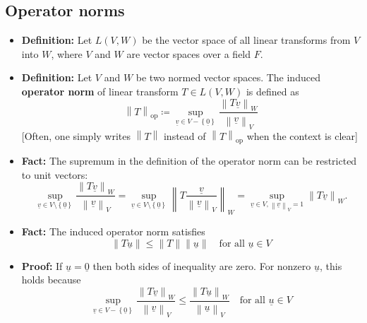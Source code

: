 \documentclass[11pt,twoside]{report}
\newcommand{\vecnot}{\underline}
\begin{document}
\subsection{Operator norms} 

\begin{itemize}

\item \textbf{Definition:} Let $L(V,W)$ be the vector space of all linear transforms from $V$ into $W$, where $V$ and $W$ are vector spaces over a field $F$.

\item \textbf{Definition:} Let $V$ and $W$ be two normed vector spaces. The  induced \textbf{operator norm} of linear transform $T \in L(V,W)$ is defined as
\begin{equation*}
\left\| T \right\|_{\mathrm{op}}
\coloneqq  \sup_{ \vecnot{v} \in V -  \left\{ \vecnot{0} \right\} }
\frac{ \left\| T \vecnot{v} \right\|_W }{ \left\| \vecnot{v} \right\|_V }
\end{equation*}
[Often, one simply writes $\left\| T \right\|$ instead of $\left\| T \right\|_{\mathrm{op}}$ when the context is clear] 

\item \textbf{Fact:} The supremum in the definition of the operator norm can be restricted to unit vectors: 
\begin{equation*}
 \sup_{ \vecnot{v} \in V \setminus \left\{ \vecnot{0} \right\} }
\frac{ \left\| T \vecnot{v} \right\|_W }{ \left\| \vecnot{v} \right\|_V } =  \sup_{ \vecnot{v} \in V \setminus \left\{ \vecnot{0} \right\} }
\left\| T \frac{  \vecnot{v}}{ \left\| \vecnot{v} \right\|_V } \right\|_W 
= \sup_{\vecnot{v} \in V, \left\| \vecnot{v} \right\|_V = 1 }
\left\| T \vecnot{v} \right\|_W .
\end{equation*}


\item \textbf{Fact:} The induced operator norm satisfies
\[
\| T \vecnot{u} \| \le \| T \| \| \vecnot{u} \| \quad \text{for all $\vecnot{u} \in V$}
\]
\item \textbf{Proof:}  If $\vecnot{u} = \vecnot{0}$ then both sides of inequality are zero. For nonzero $\vecnot{u}$, this holds because
\[
 \sup_{ \vecnot{v} \in V - \left\{ \vecnot{0} \right\} }
\frac{ \left\| T \vecnot{v} \right\|_W }{ \left\| \vecnot{v} \right\|_V } \le \frac{ \left\| T \vecnot{u} \right\|_W }{ \left\| \vecnot{u} \right\|_V } \quad \text{for all $\vecnot{u} \in V$}
\]


\end{itemize}
\end{document}
